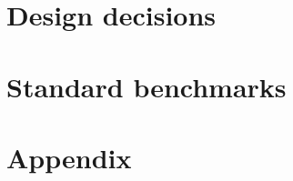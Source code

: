 \documentclass[11pt,fleqn]{book}
\begin{document}
% 
% 
%   
% 
%   
%   
%   
% 
% 
%  
%   
%   
%   
% 
% 
% 
%   
%   
%   
%   
%   
%   
%   
%   
%   
%  
%

 \part{Design decisions}
 \newpage
 




 \part{Standard benchmarks}
 \newpage
 

  
 \appendix 
 \part{Appendix}

  

 
 \newpage
 
%  
 \newpage
 
 \newpage
 
 \newpage
 
 \newpage
 
\end{document}
